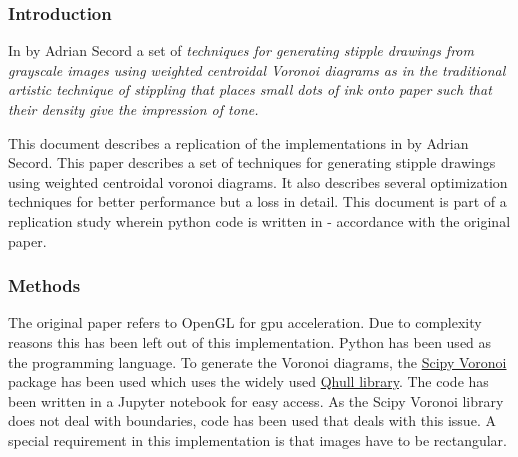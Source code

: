 
\subsubsection{Introduction}
In \cite{Secord:2002} by Adrian Secord a set of \textit{techniques for generating stipple drawings from grayscale images using weighted centroidal Voronoi diagrams as in the traditional artistic technique of stippling that places small dots of ink onto paper such that their density give the impression of tone.} 

This document describes a replication of the implementations in\cite{Secord:2002} by Adrian Secord. This paper describes a set of techniques for generating stipple drawings using weighted centroidal voronoi diagrams. It also describes several optimization techniques for better performance but a loss in detail. This document is part of a replication study wherein python code is written in - accordance with the original paper. 

\subsubsection{Methods}
The original paper refers to OpenGL for gpu acceleration. Due to complexity reasons this has been left out of this implementation. Python has been used as the programming language. To generate the Voronoi diagrams, the \href{http://www.overleaf.com}{Scipy Voronoi} package has been used which uses the widely used \href{http://www.qhull.org/}{Qhull library}. The code has been written in a Jupyter notebook for easy access. As the Scipy Voronoi library does not deal with boundaries, code has been used that deals with this issue\cite{stackoverflow:2016}. A special requirement in this implementation is that images have to be rectangular.




